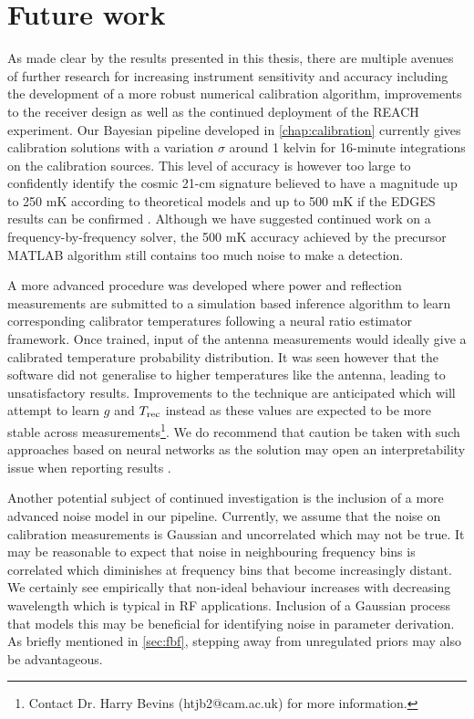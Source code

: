 \section{Future work}\label{sec:future}
As made clear by the results presented in this thesis, there are multiple avenues of further research for increasing instrument sensitivity and accuracy including the development of a more robust numerical calibration algorithm, improvements to the receiver design as well as the continued deployment of the REACH experiment. Our Bayesian pipeline developed in \cref{chap:calibration} currently gives calibration solutions with a variation $\sigma$ around 1 kelvin for 16-minute integrations on the calibration sources. This level of accuracy is however too large to confidently identify the cosmic 21-cm signature believed to have a magnitude up to 250 mK according to theoretical models and up to 500 mK if the EDGES results can be confirmed \citep{theory_models,edgesNature}. Although we have suggested continued work on a frequency-by-frequency solver, the 500 mK accuracy achieved by the precursor MATLAB algorithm still contains too much noise to make a detection.

A more advanced procedure was developed where power and reflection measurements are submitted to a simulation based inference algorithm to learn corresponding calibrator temperatures following a neural ratio estimator framework. Once trained, input of the antenna measurements would ideally give a calibrated temperature probability distribution. It was seen however that the software did not generalise to higher temperatures like the antenna, leading to unsatisfactory results. Improvements to the technique are anticipated which will attempt to learn $g$ and $T_{\mathrm{rec}}$ instead as these values are expected to be more stable across measurements\footnote{Contact Dr. Harry Bevins (htjb2@cam.ac.uk) for more information.}. We do recommend that caution be taken with such approaches based on neural networks as the solution may open an interpretability issue when reporting results \citep{bb_interpret}.

Another potential subject of continued investigation is the inclusion of a more advanced noise model in our pipeline. Currently, we assume that the noise on calibration measurements is Gaussian and uncorrelated which may not be true. It may be reasonable to expect that noise in neighbouring frequency bins is correlated which diminishes at frequency bins that become increasingly distant. We certainly see empirically that non-ideal behaviour increases with decreasing wavelength which is typical in RF applications. Inclusion of a Gaussian process that models this may be beneficial for identifying noise in parameter derivation. As briefly mentioned in \cref{sec:fbf}, stepping away from unregulated priors may also be advantageous.

